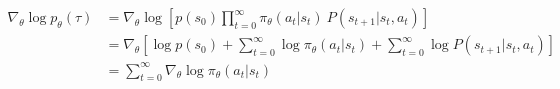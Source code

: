 \begin{align}
\nabla_\theta \log p_\theta(\tau)
&= \nabla_\theta \log \left\lbrack p(s_0)\prod_{t=0}^{\infty} \pi_\theta(a_t|s_t)\ P(s_{t+1}|s_t,a_t) \right\rbrack \\
&= \nabla_\theta \left\lbrack \log p(s_0)+\sum_{t=0}^{\infty}\log \pi_\theta(a_t|s_t)+\sum_{t=0}^{\infty}\log P(s_{t+1}|s_t,a_t) \right\rbrack  \\
&= \sum_{t=0}^{\infty} \nabla_\theta \log \pi_\theta(a_t | s_t)
\end{align}